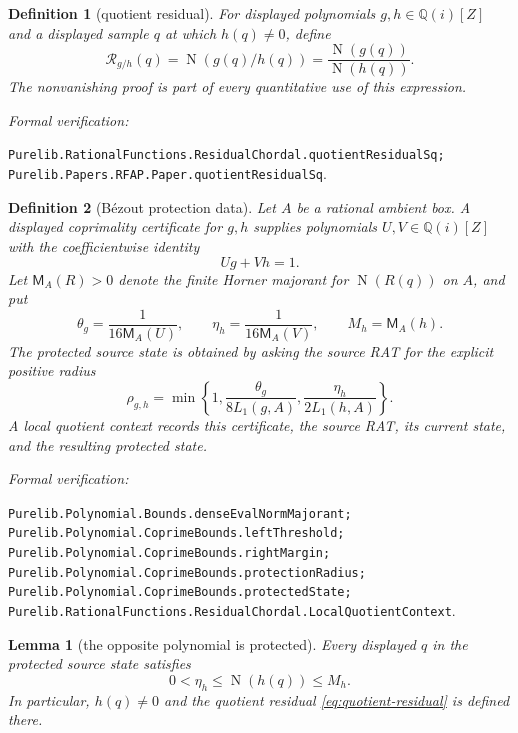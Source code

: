 \documentclass[11pt]{article}
\newtheorem{lemma}[lemma]{Lemma}
\newtheorem{definition}[definition]{Definition}
\newcommand{\Qi}{\mathbb{Q}(i)}
\newcommand{\Norm}[1]{\operatorname{N}\!\left(#1\right)}
\newcommand{\leanref}[1]{\par\smallskip\noindent
  \emph{Formal verification:}\par\nobreak
  {\raggedright\nolinkurl{#1}.\par}}
\begin{document}
\begin{definition}[quotient residual]
\label{def:quotient-residual}
For displayed polynomials $g,h\in\Qi[Z]$ and a displayed sample $q$ at which
$h(q)\ne0$, define
\begin{equation}
\label{eq:quotient-residual}
              \mathcal R_{g/h}(q)
                 =\Norm{g(q)/h(q)}
                 =\frac{\Norm{g(q)}}{\Norm{h(q)}}.
\end{equation}
The nonvanishing proof is part of every quantitative use of this expression.
\end{definition}

\leanref{Purelib.RationalFunctions.ResidualChordal.quotientResidualSq;
Purelib.Papers.RFAP.Paper.quotientResidualSq}

\begin{definition}[B\'ezout protection data]
\label{def:bezout-protection}
Let $A$ be a rational ambient box.  A displayed coprimality certificate for
$g,h$ supplies polynomials $U,V\in\Qi[Z]$ with the coefficientwise identity
\begin{equation}
\label{eq:bezout-protection}
                            Ug+Vh=1.
\end{equation}
Let $\mathsf M_A(R)>0$ denote the finite Horner majorant for
$\Norm{R(q)}$ on $A$, and put
\begin{equation}
\label{eq:protection-margins}
 \theta_g=\frac1{16\mathsf M_A(U)},
 \qquad
 \eta_h=\frac1{16\mathsf M_A(V)},
 \qquad
 M_h=\mathsf M_A(h).
\end{equation}
The \emph{protected source state} is obtained by asking the source RAT for
the explicit positive radius
\begin{equation}
\label{eq:protection-radius}
 \rho_{g,h}=\min\left\{1,
   \frac{\theta_g}{8L_1(g,A)},
   \frac{\eta_h}{2L_1(h,A)}\right\}.
\end{equation}
A local quotient context records this certificate, the source RAT, its
current state, and the resulting protected state.
\end{definition}

\leanref{Purelib.Polynomial.Bounds.denseEvalNormMajorant;
Purelib.Polynomial.CoprimeBounds.leftThreshold;
Purelib.Polynomial.CoprimeBounds.rightMargin;
Purelib.Polynomial.CoprimeBounds.protectionRadius;
Purelib.Polynomial.CoprimeBounds.protectedState;
Purelib.RationalFunctions.ResidualChordal.LocalQuotientContext}

\begin{lemma}[the opposite polynomial is protected]
\label{lem:opposite-protected}
Every displayed $q$ in the protected source state satisfies
\begin{equation}
\label{eq:opposite-bounds}
                    0<\eta_h\le\Norm{h(q)}\le M_h.
\end{equation}
In particular, $h(q)\ne0$ and the quotient residual
\eqref{eq:quotient-residual} is defined there.
\end{lemma}
\end{document}
